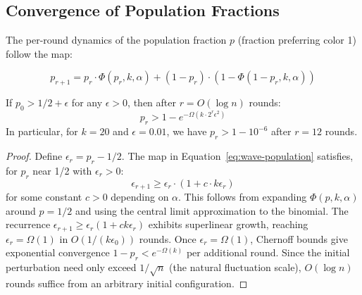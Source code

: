\subsection{Convergence of Population Fractions}

The per-round dynamics of the population fraction $p$ (fraction preferring color 1)
follow the map:

\begin{equation}
p_{r+1} = p_r \cdot \Phi(p_r, k, \alpha) + (1 - p_r) \cdot (1 - \Phi(1 - p_r, k, \alpha))
\label{eq:wave-population}
\end{equation}

\begin{theorem}
\label{thm:wave-convergence}
If $p_0 > 1/2 + \epsilon$ for any $\epsilon > 0$, then after $r = O(\log n)$ rounds:
\[
p_r > 1 - e^{-\Omega(k \cdot 2^r \epsilon^2)}
\]
In particular, for $k = 20$ and $\epsilon = 0.01$, we have $p_r > 1 - 10^{-6}$ after
$r = 12$ rounds.
\end{theorem}

\begin{proof}
Define $\epsilon_r = p_r - 1/2$. The map in Equation~\ref{eq:wave-population} satisfies, for
$p_r$ near 1/2 with $\epsilon_r > 0$:
\[
\epsilon_{r+1} \geq \epsilon_r \cdot \left(1 + c \cdot k \epsilon_r\right)
\]
for some constant $c > 0$ depending on $\alpha$. This follows from expanding $\Phi(p, k, \alpha)$
around $p = 1/2$ and using the central limit approximation to the binomial.
The recurrence $\epsilon_{r+1} \geq \epsilon_r(1 + ck\epsilon_r)$ exhibits superlinear growth,
reaching $\epsilon_r = \Omega(1)$ in $O(1/(k\epsilon_0))$ rounds. Once $\epsilon_r = \Omega(1)$,
Chernoff bounds give exponential convergence $1 - p_r < e^{-\Omega(k)}$ per additional round.
Since the initial perturbation need only exceed $1/\sqrt{n}$ (the natural fluctuation scale),
$O(\log n)$ rounds suffice from an arbitrary initial configuration.
\end{proof}

